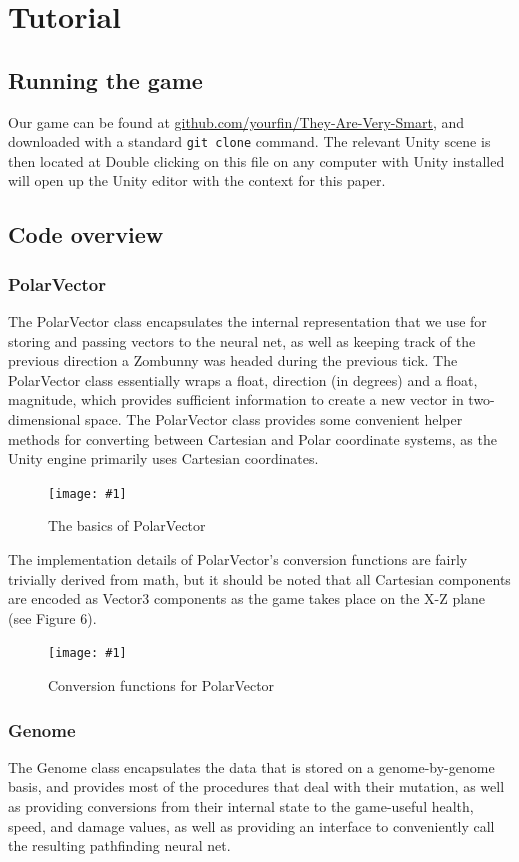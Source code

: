 \documentclass[letterpaper]{article}
\def\imfigB#1#2{\begin{figure} \centering \texttt{[image: \#1]} \caption{#2} \end{figure}}
\begin{document}
\section{Tutorial}

\subsection{Running the game}
Our game can be found at
\href{https://github.com/YourFin/They-Are-Very-Smart}{github.com/yourfin/They-Are-Very-Smart},
and downloaded with a standard \texttt{git clone} command. The relevant Unity
scene is then located at
Double clicking on this file on any computer with Unity installed will open up
the Unity editor with the context for this paper.

\subsection{Code overview}
\subsubsection{PolarVector}
The PolarVector class encapsulates the internal representation that we use for storing and passing vectors to the neural net, as well as keeping track of the previous direction a Zombunny was headed during the previous tick. The PolarVector class essentially wraps a float, direction (in degrees) and a float, magnitude, which provides sufficient information to create a new vector in two-dimensional space. The PolarVector class provides some convenient helper methods for converting between Cartesian and Polar coordinate systems, as the Unity engine primarily uses Cartesian coordinates.

\imfigB{PolarVector1}{The basics of PolarVector}

The implementation details of PolarVector's conversion functions are fairly trivially derived from math, but it should be noted that all Cartesian components are encoded as Vector3 components as the game takes place on the X-Z plane (see Figure 6). 

\imfigB{PolarVector2}{Conversion functions for PolarVector}

\subsubsection{Genome}
The Genome class encapsulates the data that is stored on a genome-by-genome basis, and provides most of the procedures that deal with their mutation, as well as providing conversions from their internal state to the game-useful health, speed, and damage values, as well as providing an interface to conveniently call the resulting pathfinding neural net.
\end{document}
